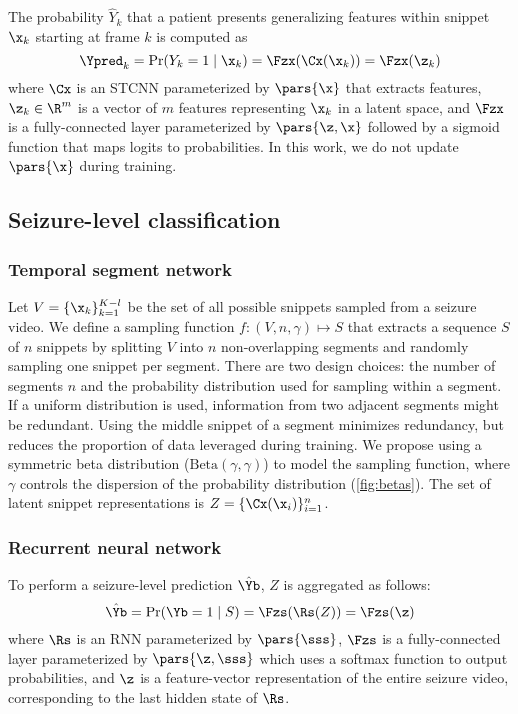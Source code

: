 The probability $\hat{Y}_k$ that a patient presents generalizing features within snippet $\x_k$ starting at frame $k$ is computed as
\begin{equation}
    \Ypred_k = \Pr(Y_k = 1 \mid \x_k) = \Fzx( \Cx(\x_k) ) = \Fzx( \z_k)
\end{equation}
where
$\Cx$ is an \ac{STCNN} parameterized by $\pars{\x}$ that extracts features,
$\z_k \in \R ^ m$ is a vector of $m$ features representing $\x_k$ in a latent space,
and
$\Fzx$ is a fully-connected layer parameterized by $\pars{\z,\x}$ followed by a sigmoid function that maps logits to probabilities.
In this work, we do not update $\pars{\x}$ during training.

\subsection{Seizure-level classification}
\label{sec:meth_seizure}

\subsubsection{Temporal segment network}
Let $V = \{ \x_k \}_{k=1}^{K-l}$ be the set of all possible snippets sampled from a seizure video.
We define a sampling function $f : (V, n, \gamma) \mapsto S$ that extracts a sequence $S$ of $n$ snippets by splitting $V$ into $n$ non-overlapping segments and randomly sampling one snippet per segment.
There are two design choices: the number of segments $n$ and the probability distribution used for sampling within a segment.
If a uniform distribution is used,
information from two adjacent segments might be redundant.
Using the middle snippet of a segment minimizes redundancy, but reduces the proportion of data leveraged during training.
We propose using a symmetric beta distribution ($\text{Beta}(\gamma, \gamma)$) to model the sampling function,
where $\gamma$ controls the dispersion of the probability distribution (\cref{fig:betas}).
The set of latent snippet representations is $Z = \{ \Cx (\x_i) \}_{i = 1}^{n}$.


\subsubsection{Recurrent neural network}

To perform a seizure-level prediction $\hat{\Yb}$, $Z$ is aggregated as follows:
\begin{equation}
    \hat{\Yb}
    = \Pr(\Yb = 1 \mid S)
    = \Fzs( \Rs ( Z ) )
    = \Fzs( \z )
\end{equation}
where
$\Rs$ is an \ac{RNN} parameterized by $\pars{\sss}$,
$\Fzs$ is a fully-connected layer parameterized by $\pars{\z,\sss}$ which uses a softmax function to output probabilities,
and $\z$ is a feature-vector representation of the entire seizure video, corresponding to the last hidden state of $\Rs$.